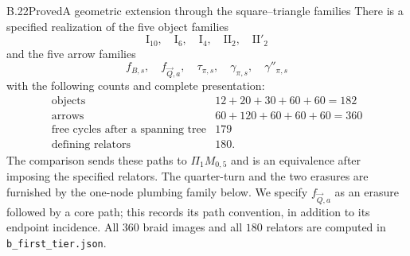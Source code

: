 \begin{result}{B.22}{Proved}{A geometric extension through the square--triangle families}
There is a specified realization of the five object families
\[
 \mathrm I_{10},\quad\mathrm I_6,\quad\mathrm I_4,
 \quad\mathrm {II}_2,\quad\mathrm {II}'_2
\]
and the five arrow families
\[
 f_{B,s},\quad f_{\vec Q,a},\quad\tau_{\pi,s},
 \quad\gamma_{\pi,s},\quad\gamma''_{\pi,s}
\]
with the following
counts and complete presentation:
\[
\begin{array}{c|r}
 \text{objects}&12+20+30+60+60=182\\
 \text{arrows}&60+120+60+60+60=360\\
 \text{free cycles after a spanning tree}&179\\
 \text{defining relators}&180.
\end{array}                                                     \tag{B.45}
\]
The comparison sends these paths to $\Pi_1M_{0,5}$ and is an
equivalence after imposing the specified relators.  The
quarter-turn and the two erasures are furnished by the
one-node plumbing family below.  We specify $f_{\vec Q,a}$
as an erasure followed by a core path; this records its
path convention, in addition to its endpoint incidence.
All $360$ braid images and all $180$ relators are computed
in \texttt{b\_first\_tier.json}.
\end{result}
